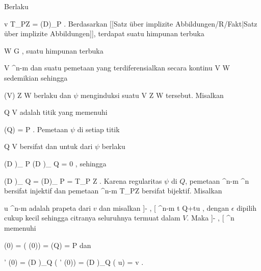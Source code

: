 {

Berlaku

\mavergleichskette
{\vergleichskette
{v
}
{ \in }{ T_PZ
}
{ = }{   \left(D\varphi\right)_{P}
}
{    }{
}
{   }{
}
}
{}{}{.}
Berdasarkan
[[Satz über implizite Abbildungen/R/Fakt|Satz über implizite Abbildungen]],
terdapat suatu himpunan terbuka

 {}
 {W \subseteq G} {}
 {} {} {} {,}
suatu himpunan terbuka

\mavergleichskette
{\vergleichskette
{ V
}
{ \subseteq }{ \R^{n-m}
}
{  }{
}
{    }{
}
{   }{
}
}
{}{}{}
dan suatu pemetaan yang terdiferensialkan secara kontinu
\maabbdisp {\psi} { V } { W
} {}
sedemikian sehingga

\mavergleichskette
{\vergleichskette
{ \psi(V)
}
{ \subseteq }{ Z \cap W
}
{  }{
}
{    }{
}
{   }{
}
}
{}{}{}
berlaku dan $\psi$ menginduksi suatu
\maabbdisp {\psi} { V } { Z \cap W
} {}
tersebut. Misalkan

\mavergleichskette
{\vergleichskette
{ Q
}
{ \in }{ V
}
{  }{
}
{    }{
}
{   }{
}
}
{}{}{}
adalah titik yang memenuhi

\mavergleichskette
{\vergleichskette
{ \psi(Q)
}
{ = }{ P
}
{  }{
}
{    }{
}
{   }{
}
}
{}{}{.}
Pemetaan $\psi$ di setiap titik

\mavergleichskette
{\vergleichskette
{ Q
}
{ \in }{ V
}
{  }{
}
{    }{
}
{   }{
}
}
{}{}{}
bersifat
dan untuk
dari $\psi$ berlaku

\mavergleichskettedisp
{\vergleichskette
{ \left(D \varphi \right)_{ P }  \circ \left(D \psi \right)_{ Q }
}
{ =} { 0
}
{ } {
}
{ } {
}
{ } {
}
}
{}{}{,}
sehingga

\mavergleichskettedisp
{\vergleichskette
{   \left(D \psi\right)_{ Q }
}
{ =} {   \left(D\varphi \right)_{ P }
}
{ =} { T_P Z
}
{ } {
}
{ } {
}
}
{}{}{.}
Karena regularitas $\psi$ di $Q$, pemetaan
 { \R^{n-m}  } { \R^n
} {}
bersifat injektif dan pemetaan
 { \R^{n-m}  } { T_PZ
} {}
bersifat bijektif. Misalkan

\mavergleichskette
{\vergleichskette
{ u
}
{ \in }{ \R^{n-m}
}
{  }{
}
{    }{
}
{   }{
}
}
{}{}{}
adalah prapeta dari $v$ dan misalkan
\maabbeledisp {\theta} { ]- \epsilon, \epsilon[ } { \R^{n-m}
} { t } { Q+tu
} {,}
dengan $\epsilon$ dipilih cukup kecil sehingga citranya seluruhnya termuat dalam $V$. Maka
\maabbdisp {\gamma = \psi \circ \theta} { ]- \epsilon, \epsilon[  } { \R^n
} {}
memenuhi

\mavergleichskettedisp
{\vergleichskette
{ \gamma(0)
}
{ =} { \psi( \theta (0))
}
{ =} { \psi(Q)
}
{ =} { P
}
{ } {
}
}
{}{}{}
dan

\mavergleichskettedisp
{\vergleichskette
{ \gamma' (0)
}
{ =} { \left(D \psi\right)_{Q} ( \theta' (0))
}
{ =} { \left(D \psi\right)_{Q} ( u)
}
{ =} { v
}
{ } {
}
}
{}{}{.}

 }

